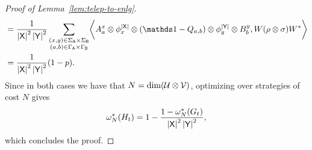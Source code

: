 \begin{proof}[Proof of Lemma~\ref{lem:telep-to-enlg}]
\begin{equation}
\begin{aligned}
		&= \frac{1}{\abs{\reg{X}}^2\abs{\reg{Y}}^2} \sum_{\substack{(x,y) \in \SigmaA \times \SigmaB \\ (a,b) \in \GammaA \times \GammaB}} \biggip{A_a^x \otimes \phi_x^{\abs{\reg{X}}} \otimes (\I - Q_{a,b}) \otimes \phi_y^{\abs{\reg{Y}}} \otimes B_b^y}{W (\rho \otimes \sigma) W^*}  \\
		&= \frac{1}{\abs{\reg{X}}^2\abs{\reg{Y}}^2} (1-p).
	\end{aligned}
\end{equation}
Since in both cases we have that $N = \dim(\mathcal{U} \otimes \mathcal{V})$, optimizing over strategies of cost $N$ gives 
\begin{align}
	\omega_N^*(H_t) = 1 - \frac{ 1 - \omega_N^*(G_t) }{\left\lvert \mathsf{X} \right\rvert^2 \left\lvert \mathsf{Y} \right\rvert^2},
\end{align}
which concludes the proof.


\end{proof}

